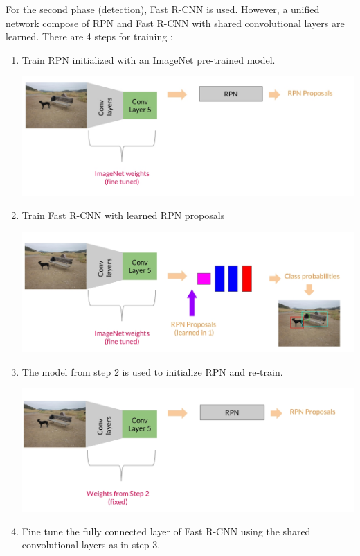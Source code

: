 \documentclass{article}
\begin{document}
For the second phase (detection), Fast R-CNN is used.  However, a unified network compose of RPN and Fast R-CNN with shared convolutional layers are learned. There are 4 steps for training \cite{slides/faster-rcnn}:

\begin{enumerate}
	\item Train RPN initialized with an ImageNet pre-trained model.
	\begin{center}
		\includegraphics[scale=0.3]{faster_rcnn_step_1}
	\end{center}
	\item Train Fast R-CNN with learned RPN proposals
	\begin{center}
		\includegraphics[scale=0.3]{faster_rcnn_step_2}
	\end{center}
	\item The model from step 2 is used to initialize RPN and re-train.
	\begin{center}
		\includegraphics[scale=0.3]{faster_rcnn_step_3}
	\end{center}
	\item Fine tune the fully connected layer of Fast R-CNN using the shared convolutional layers as in step 3.

\end{enumerate}
\end{document}

